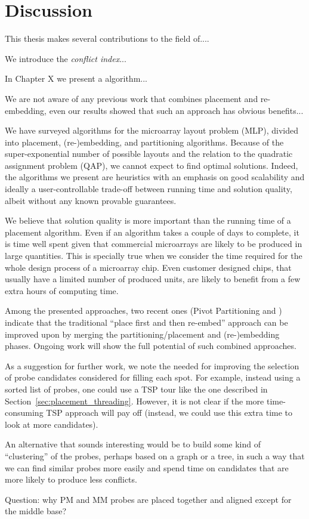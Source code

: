 \chapter{Discussion}
\label{ch:discussion}

This thesis makes several contributions to the field of....

We introduce the \emph{conflict index}...

In Chapter X we present a algorithm...

We are not aware of any previous work that combines placement and
re-embedding, even our results showed that such an approach has
obvious benefits...

We have surveyed algorithms for the microarray layout problem (MLP), divided
into placement, (re-)embedding, and partitioning algorithms.  Because of the
super-exponential number of possible layouts and the relation to the quadratic
assignment problem (QAP), we cannot expect to find optimal solutions. Indeed,
the algorithms we present are heuristics with an emphasis on good scalability
and ideally a user-controllable trade-off between running time and solution
quality, albeit without any known provable guarantees.

We believe that solution quality is more important than the running time of a
placement algorithm. Even if an algorithm takes a couple of days to complete,
it is time well spent given that commercial microarrays are likely to be
produced in large quantities. This is specially true when we consider the time
required for the whole design process of a microarray chip. Even customer
designed chips, that usually have a limited number of produced units, are likely
to benefit from a few extra hours of computing time.

Among the presented approaches, two recent ones (Pivot Partitioning and
\Greedyplus) indicate that the traditional ``place first and then re-embed''
approach can be improved upon by merging the partitioning/placement and
(re-)embedding phases. Ongoing work will show the full potential of such
combined approaches.

As a suggestion for further work, we note the needed for improving
the selection of probe candidates considered for filling each spot. For
example, instead using a sorted list of probes, one could use a TSP tour
like the one described in Section~\ref{sec:placement_threading}. However,
it is not clear if the more time-consuming TSP approach will pay off
(instead, we could use this extra time to look at more candidates).

An alternative that sounds interesting would be to build some kind of
``clustering'' of the probes, perhaps based on a graph or a tree, in such a
way that we can find similar probes more easily and spend time on candidates
that are more likely to produce less conflicts.

Question: why PM and MM probes are placed together and aligned except for the
middle base?